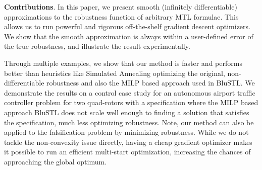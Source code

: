 \textbf{Contributions}. In this paper, we present smooth (infinitely differentiable) approximations to the robustness function of arbitrary MTL formulae.
This allows us to run powerful and rigorous off-the-shelf gradient descent optimizers.
We show that the smooth approximation is always within a user-defined error of the true robustness, and illustrate the result experimentally.

Through multiple examples, we show that our method is faster and performs better than heuristics like Simulated Annealing optimizing the original, non-differentiable robustness and also the MILP based approach used in BluSTL. 
We demonstrate the results on a control case study for an autonomous airport traffic controller problem for two quad-rotors with a specification where the MILP based approach BluSTL does not scale well enough to finding a solution that satisfies the specification, much less optimizing robustness. 
 Note, our method can also be applied to the falsification problem \cite{AbbasATVA11_LinFalsification} by minimizing robustness. 
While we do not tackle the non-convexity issue directly, having a cheap gradient optimizer makes it possible to run an efficient multi-start optimization, increasing the chances of approaching the global optimum.

